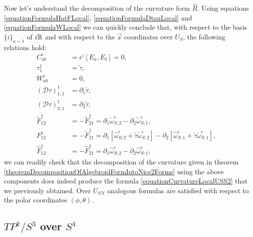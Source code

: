 Now let's understand the decomposition of the curvature form $\hat R$. Using equations \eqref{equationFormulaHatFLocal}, \eqref{equationFormulaDtauLocal} and \eqref{equationFormulaWLocal} we can quickly conclude that, with respect to the basis $\{i\}_{a = 1}$ of $i\mathbb{R}$ and with respect to the $\vec x$ coordinates over $U_S$, the following relations hold:
\begin{align*}
    C^c_{ab} &= \epsilon^c[E_a, E_b] = 0,\\
    \tau^1_1 &= \tilde \tau,\\
    W_{ab}^c &= 0,\\
    (\mathcal D \tau)^1_{1,1} &= \partial_1 \tilde \tau,\\
    (\mathcal D \tau)^1_{2,1} &= \partial_2 \tilde \tau,\\
    \tilde F^1_{12} &= - \tilde F^1_{21} = \partial_{1} \tilde \omega^\epsilon_{S;2} - \partial_{2} \tilde \omega^\epsilon_{S;1},\\
    F^1_{12} &= - \tilde F^1_{21} = \partial_{1} [\hat \omega^\epsilon_{S;2} + \tilde \tau \tilde \omega^\epsilon_{S;2}] - \partial_{2} [\hat \omega^\epsilon_{S;1} + \tilde \tau \tilde \omega^\epsilon_{S;1}],\\
    \hat F^1_{12} &= - \hat F^1_{21} = \partial_{1} \hat \omega^\epsilon_{S;2} - \partial_{2} \hat \omega^\epsilon_{S;1};
\end{align*}
we can readily check that the decomposition of the curvature given in theorem \ref{theoremDecompositionOfAlgebroidFormIntoNice2Forms} using the above components does indeed produce the formula \eqref{equationCurvatureLocalUSS2} that we previously obtained. Over $U_{SN}$ analogous formulas are satisfied with respect to the polar coordinates $(\phi, \theta)$.


\subsection{$TP^k/S^3$ over $S^4$}\label{subsectionConnectionsTPkS3}

